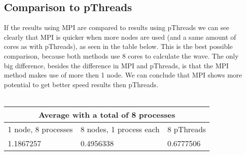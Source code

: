 \documentclass[a4paper]{article}
\begin{document}
    \subsection{Comparison to pThreads}
    If the results using MPI are compared to results using pThreads we can see
    clearly that MPI is quicker when more nodes are used (and a same amount
    of cores as with pThreads), as seen in the table below.
    This is the best possible
    comparison, because both methods use 8 cores to calculate the wave.
    The only big difference,
    besides the difference in MPI and pThreads, is that the MPI method makes use of more then 1 node. We can conclude that MPI shows more potential to get better speed results then pThreads.\\\\
    \begin{tabular}{| p{} | p{} | p{} |}
      \hline
      \multicolumn{3}{|c|}{Average with a total of 8 processes}\\
      \hline
      1 node, 8 processes & 8 nodes, 1 process each & 8 pThreads \\
      \hline
      1.1867257 & 0.4956338 & 0.6777506\\
      \hline
    \end{tabular}
    
    
    
\end{document}
